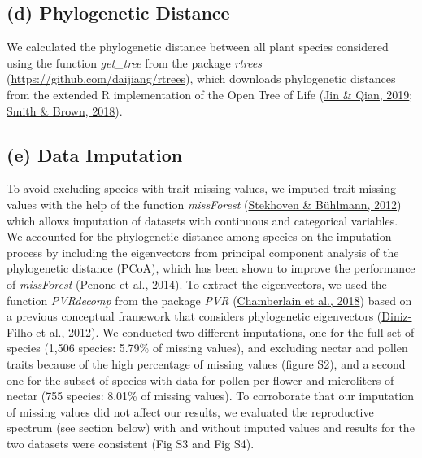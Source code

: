 \documentclass[
  12pt,
  a4paper,
]{article}
\begin{document}
\doublespacing

\hypertarget{d-phylogenetic-distance}{%
\subsection{(d) Phylogenetic Distance}\label{d-phylogenetic-distance}}

We calculated the phylogenetic distance between all plant species considered using the function \emph{get\_tree} from the package \emph{rtrees} (\url{https://github.com/daijiang/rtrees}), which downloads phylogenetic distances from the extended R implementation of the Open Tree of Life (\protect\hyperlink{ref-jin2019}{Jin \& Qian, 2019}; \protect\hyperlink{ref-smith2018}{Smith \& Brown, 2018}).

\hypertarget{e-data-imputation}{%
\subsection{(e) Data Imputation}\label{e-data-imputation}}

To avoid excluding species with trait missing values, we imputed trait missing values with the help of the function \emph{missForest} (\protect\hyperlink{ref-stekhoven2012}{Stekhoven \& Bühlmann, 2012}) which allows imputation of datasets with continuous and categorical variables. We accounted for the phylogenetic distance among species on the imputation process by including the eigenvectors from principal component analysis of the phylogenetic distance (PCoA), which has been shown to improve the performance of \emph{missForest} (\protect\hyperlink{ref-penone2014}{Penone et al., 2014}). To extract the eigenvectors, we used the function \emph{PVRdecomp} from the package \emph{PVR} (\protect\hyperlink{ref-santos2018}{Chamberlain et al., 2018}) based on a previous conceptual framework that considers phylogenetic eigenvectors (\protect\hyperlink{ref-diniz-filho2012}{Diniz-Filho et al., 2012}). We conducted two different imputations, one for the full set of species (1,506 species: 5.79\% of missing values), and excluding nectar and pollen traits because of the high percentage of missing values (figure S2), and a second one for the subset of species with data for pollen per flower and microliters of nectar (755 species: 8.01\% of missing values). To corroborate that our imputation of missing values did not affect our results, we evaluated the reproductive spectrum (see section below) with and without imputed values and results for the two datasets were consistent (Fig S3 and Fig S4).
\end{document}
